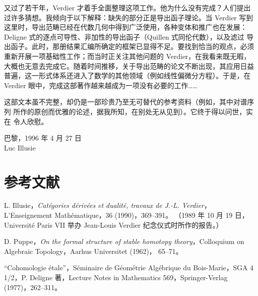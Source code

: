 又过了若干年，Verdier 才着手全面整理这项工作。他为什么没有完成？人们提出
过许多猜想。我倾向于以下解释：缺失的部分正是导出函子理论。当 Verdier 写到
这里时，导出范畴已经在代数几何中得到广泛使用，各种变体和推广也在发展：
Deligne 式的逐点可导性、非加性的导出函子（Quillen 式同伦代数），以及滤过
导出函子。此时，那册结果汇编所确定的框架已显得不足。要找到恰当的观点，必须
重新开展一项基础性工作；而当时正关注其他问题的 Verdier，在我看来既无暇，
大概也无意去完成它。随着时间推移，关于导出范畴的论文不断出现，其应用日益
普遍，这一形式体系还进入了数学的其他领域（例如线性偏微分方程）。于是，在
Verdier 眼中，完成这部著作越来越成为一项没有必要的工作……

\clearpage
{}
这部文本虽不完整，却仍是一部珍贵乃至无可替代的参考资料（例如，其中对谱序列
所作的原创而优雅的论述，据我所知，在别处无从见到）。它终于得以问世，实在
令人欣慰。

\begin{flushright}
巴黎，1996 年 4 月 27 日\\
Luc Illusie
\end{flushright}

\section*{参考文献}

\begin{description}[labelwidth=6.2em,leftmargin=6.8em]
\item[{[I]}] L. Illusie，\emph{Catégories dérivées et dualité, travaux de
J.-L. Verdier}，L'Enseignement Mathématique，36 (1990)，369--391。
（1989 年 10 月 19 日，Université Paris VII 举办 Jean-Louis Verdier
纪念仪式时所作的报告。）

\item[{[P]}] D. Puppe，\emph{On the formal structure of stable homotopy
theory}，Colloquium on Algebraic Topology，Aarhus Universitet (1962)，
65--71。

\item[{\mbox{[SGA 4 1/2]}}] “Cohomologie étale”，Séminaire de Géométrie
Algébrique du Bois-Marie，SGA 4 1/2，P. Deligne 著，Lecture Notes in
Mathematics 569，Springer-Verlag (1977)，262--311。
\end{description}
